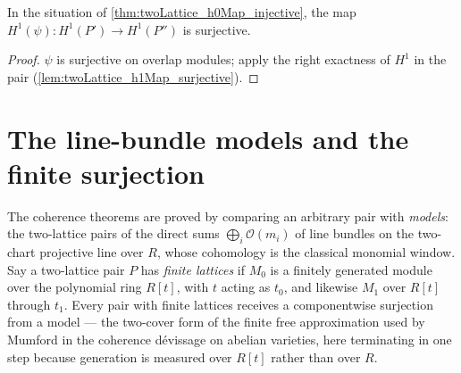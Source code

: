 \begin{theorem}
  \label{thm:twoLattice_h1Map_surjective_ses}
  \leanok
  In the situation of \ref{thm:twoLattice_h0Map_injective}, the map
  \(H^1(\psi) : H^1(P') \to H^1(P'')\) is surjective.
\end{theorem}
\begin{proof}
  \leanok
  \(\psi\) is surjective on overlap modules; apply the right exactness of \(H^1\) in
  the pair (\ref{lem:twoLattice_h1Map_surjective}).
\end{proof}

\section{The line-bundle models and the finite surjection}
\label{sec:two_lattice_models}

The coherence theorems are proved by comparing an arbitrary pair with \emph{models}: the
two-lattice pairs of the direct sums \(\bigoplus_{i} \mathcal O(m_i)\) of line bundles on
the two-chart projective line over \(R\), whose cohomology is the classical monomial
window. Say a two-lattice pair \(P\) has \emph{finite lattices} if \(M_0\) is a finitely
generated module over the polynomial ring \(R[t]\), with \(t\) acting as \(t_0\), and
likewise \(M_1\) over \(R[t]\) through \(t_1\). Every pair with finite lattices receives
a componentwise surjection from a model --- the two-cover form of the finite free
approximation used by Mumford in the coherence dévissage on abelian varieties, here
terminating in one step because generation is measured over \(R[t]\) rather than over
\(R\).

